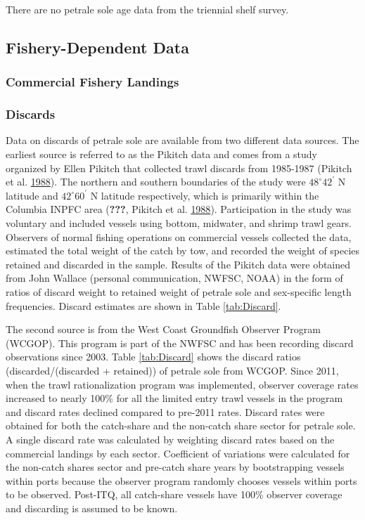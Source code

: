 \documentclass[12pt,]{article}
\begin{document}
There are no petrale sole age data from the triennial shelf survey.

\subsection{Fishery-Dependent Data}\label{fishery-dependent-data}

\subsubsection{Commercial Fishery
Landings}\label{commercial-fishery-landings}

\subsubsection{Discards}\label{discards}

Data on discards of petrale sole are available from two different data
sources. The earliest source is referred to as the Pikitch data and
comes from a study organized by Ellen Pikitch that collected trawl
discards from 1985-1987 (Pikitch et al.
\protect\hyperlink{ref-pikitch_evaluation_1988}{1988}). The northern and
southern boundaries of the study were \(48^\circ 42^\prime\) N latitude
and \(42^\circ 60^\prime\) N latitude respectively, which is primarily
within the Columbia INPFC area ({\textbf{???}}, Pikitch et al.
\protect\hyperlink{ref-pikitch_evaluation_1988}{1988}). Participation in
the study was voluntary and included vessels using bottom, midwater, and
shrimp trawl gears. Observers of normal fishing operations on commercial
vessels collected the data, estimated the total weight of the catch by
tow, and recorded the weight of species retained and discarded in the
sample. Results of the Pikitch data were obtained from John Wallace
(personal communication, NWFSC, NOAA) in the form of ratios of discard
weight to retained weight of petrale sole and sex-specific length
frequencies. Discard estimates are shown in Table \ref{tab:Discard}.

The second source is from the West Coast Groundfish Observer Program
(WCGOP). This program is part of the NWFSC and has been recording
discard observations since 2003. Table \ref{tab:Discard} shows the
discard ratios (discarded/(discarded + retained)) of petrale sole from
WCGOP. Since 2011, when the trawl rationalization program was
implemented, observer coverage rates increased to nearly 100\% for all
the limited entry trawl vessels in the program and discard rates
declined compared to pre-2011 rates. Discard rates were obtained for
both the catch-share and the non-catch share sector for petrale sole. A
single discard rate was calculated by weighting discard rates based on
the commercial landings by each sector. Coefficient of variations were
calculated for the non-catch shares sector and pre-catch share years by
bootstrapping vessels within ports because the observer program randomly
chooses vessels within ports to be observed. Post-ITQ, all catch-share
vessels have 100\% observer coverage and discarding is assumed to be
known.
\end{document}
